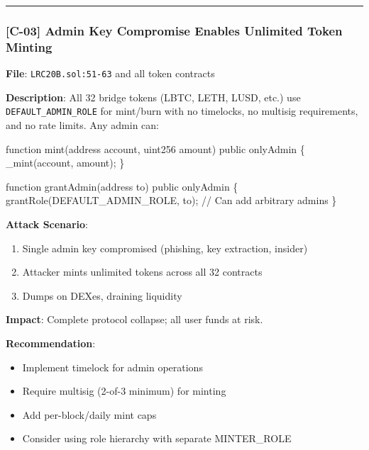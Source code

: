 \documentclass[
]{article}
\newenvironment{Shaded}{}{}
\newcommand{\NormalTok}[1]{#1}
\providecommand{\tightlist}{%
  \setlength{\itemsep}{0pt}\setlength{\parskip}{0pt}}
\begin{document}
\begin{center}\rule{0.5\linewidth}{0.5pt}\end{center}

\subsubsection{{[}C-03{]} Admin Key Compromise Enables Unlimited Token
Minting}\label{c-03-admin-key-compromise-enables-unlimited-token-minting}

\textbf{File}: \texttt{LRC20B.sol:51-63} and all token contracts

\textbf{Description}: All 32 bridge tokens (LBTC, LETH, LUSD, etc.) use
\texttt{DEFAULT\_ADMIN\_ROLE} for mint/burn with no timelocks, no
multisig requirements, and no rate limits. Any admin can:

\begin{Shaded}
\begin{Highlighting}[]
\NormalTok{function mint(address account, uint256 amount) public onlyAdmin \{}
\NormalTok{    \_mint(account, amount);}
\NormalTok{\}}

\NormalTok{function grantAdmin(address to) public onlyAdmin \{}
\NormalTok{    grantRole(DEFAULT\_ADMIN\_ROLE, to);  // Can add arbitrary admins}
\NormalTok{\}}
\end{Highlighting}
\end{Shaded}

\textbf{Attack Scenario}:

\begin{enumerate}
\def\labelenumi{\arabic{enumi}.}
\tightlist
\item
  Single admin key compromised (phishing, key extraction, insider)
\item
  Attacker mints unlimited tokens across all 32 contracts
\item
  Dumps on DEXes, draining liquidity
\end{enumerate}

\textbf{Impact}: Complete protocol collapse; all user funds at risk.

\textbf{Recommendation}:

\begin{itemize}
\tightlist
\item
  Implement timelock for admin operations
\item
  Require multisig (2-of-3 minimum) for minting
\item
  Add per-block/daily mint caps
\item
  Consider using role hierarchy with separate MINTER\_ROLE
\end{itemize}
\end{document}
